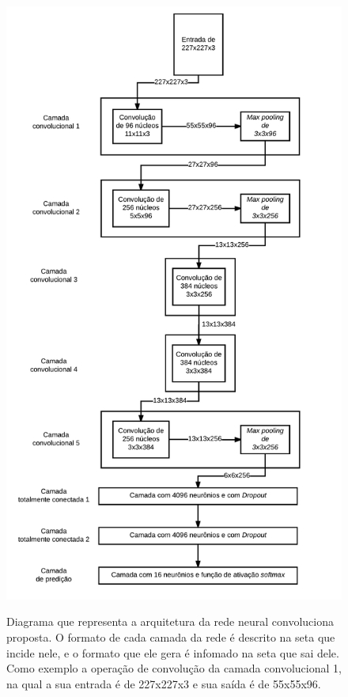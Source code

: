 \begin{figure}[H]
  \centering
  \caption{Diagrama que representa a arquitetura da rede neural convoluciona proposta. O formato de cada camada da rede é descrito na seta que incide nele, e o formato que ele gera é infomado na seta que sai dele. Como exemplo a operação de convolução da camada convolucional 1, na qual a sua entrada é de 227x227x3 e sua saída é de 55x55x96.}
  \includegraphics[width=350pt]{dados/figuras/dia_rede}
  \label{fig:arqrede}
\end{figure}

